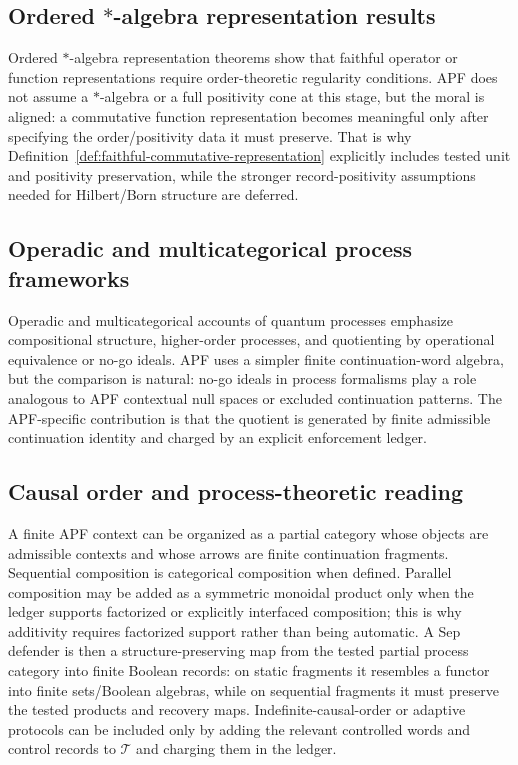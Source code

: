 \documentclass[11pt]{article}
\begin{document}
\subsection*{Ordered $*$-algebra representation results}
Ordered $*$-algebra representation theorems show that faithful operator or function representations require order-theoretic regularity conditions.  APF does not assume a $*$-algebra or a full positivity cone at this stage, but the moral is aligned: a commutative function representation becomes meaningful only after specifying the order/positivity data it must preserve.  That is why Definition~\ref{def:faithful-commutative-representation} explicitly includes tested unit and positivity preservation, while the stronger record-positivity assumptions needed for Hilbert/Born structure are deferred.

\subsection*{Operadic and multicategorical process frameworks}
Operadic and multicategorical accounts of quantum processes emphasize compositional structure, higher-order processes, and quotienting by operational equivalence or no-go ideals.  APF uses a simpler finite continuation-word algebra, but the comparison is natural: no-go ideals in process formalisms play a role analogous to APF contextual null spaces or excluded continuation patterns.  The APF-specific contribution is that the quotient is generated by finite admissible continuation identity and charged by an explicit enforcement ledger.

\subsection*{Causal order and process-theoretic reading}
A finite APF context can be organized as a partial category whose objects are admissible contexts and whose arrows are finite continuation fragments.  Sequential composition is categorical composition when defined.  Parallel composition may be added as a symmetric monoidal product only when the ledger supports factorized or explicitly interfaced composition; this is why additivity requires factorized support rather than being automatic.  A Sep defender is then a structure-preserving map from the tested partial process category into finite Boolean records: on static fragments it resembles a functor into finite sets/Boolean algebras, while on sequential fragments it must preserve the tested products and recovery maps.  Indefinite-causal-order or adaptive protocols can be included only by adding the relevant controlled words and control records to $\mathcal T$ and charging them in the ledger.
\end{document}
